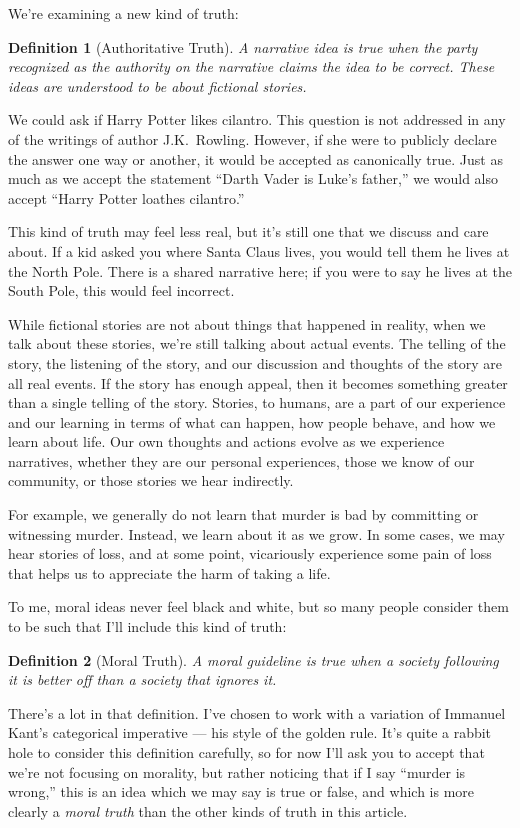 \documentclass[11pt, oneside]{article}   	%
\newtheorem{defn}{Definition}
\begin{document}
We're examining a new kind of truth:
\begin{defn}[Authoritative Truth]
    A narrative idea is true when the party recognized as the authority on the
    narrative claims the idea to be correct. These ideas are understood to be
    about fictional stories.
\end{defn}

We could ask if Harry Potter likes cilantro. This question is not addressed in
any of the writings of author J.K.~Rowling. However, if she were to publicly
declare the answer one way or another, it would be accepted as canonically true.
Just as much as we accept the statement ``Darth Vader is Luke's father,'' we
would also accept ``Harry Potter loathes cilantro.''

This kind of truth may feel less real,
but it's still one that we discuss and
care about. If a kid asked you where Santa Claus lives, you would tell them he
lives at the North Pole. There is a shared narrative here; if you were to say he
lives at the South Pole, this would feel incorrect.

While fictional stories are not about things that happened in reality, when we
talk about these stories, we're still talking about actual events. The telling
of the story, the listening of the story, and our discussion and thoughts of the
story are all real events.
If the story has enough appeal,
then it becomes something greater than a single telling of the story. Stories,
to humans, are a part of our experience and our learning in terms of what can
happen, how people behave, and how we learn about life. Our own thoughts and
actions evolve as we experience narratives, whether they are our personal
experiences, those we know of our community, or those stories we hear
indirectly.

For example, we generally do not learn that murder is bad by committing or
witnessing murder. Instead, we learn about it as we grow. In some cases, we may
hear stories of loss, and at some point, vicariously experience some pain of
loss that helps us to appreciate the harm of taking a life.

To me, moral ideas never feel black and white, but so many people consider them
to be such that I'll include this kind of truth:
\begin{defn}[Moral Truth]
    A moral guideline is true when a society following it is better off than a
    society that ignores it.
\end{defn}

There's a lot in that definition. I've chosen to work with a variation of
Immanuel Kant's categorical imperative --- his style of the golden rule. It's
quite a rabbit hole to consider this definition carefully, so for now I'll ask
you to accept that we're not focusing on morality, but rather noticing that if I
say ``murder is wrong,'' this is an idea which we may say is true or false, and
which is more clearly a {\em moral truth} than the other kinds of truth in this
article.
\end{document}
